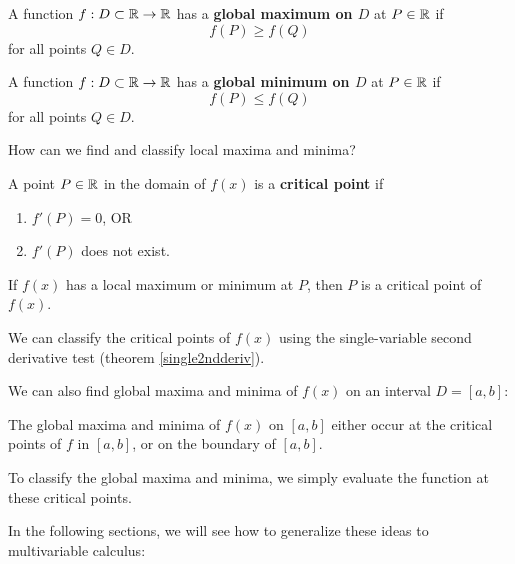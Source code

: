 \begin{definition}
    A function $f: D \subset \mathbb{R} \to \mathbb{R}$ has a \textbf{global maximum on $D$} at $P \in \mathbb{R}$ if
    $$f(P) \geq f(Q)$$
    for all points $Q \in D$.
    \end{definition}

    \begin{definition}
    A function $f: D \subset \mathbb{R} \to \mathbb{R}$ has a \textbf{global minimum on $D$} at $P \in \mathbb{R}$ if 
    $$f(P) \leq f(Q)$$
    for all points $Q \in D$.
    \end{definition}

\begin{motivating}
    How can we find and classify local maxima and minima?
\end{motivating}

\begin{definition}
        A point $P \in \mathbb{R}$ in the domain of $f(x)$ is a \textbf{critical point} if
        
        \begin{enumerate}
            \item $f'(P) = 0$, OR
            \item $f'(P)$ does not exist.
        \end{enumerate}
        
    \end{definition}

    \begin{theorem}
        If $f(x)$ has a local maximum or minimum at $P$, then $P$ is a critical point of $f(x)$.
    \end{theorem}

    We can classify the critical points of $f(x)$ using the single-variable second derivative test (theorem \ref{single2ndderiv}).

    We can also find global maxima and minima of $f(x)$ on an interval $D = [a,b]$:

    \begin{theorem}
    The global maxima and minima of $f(x)$ on $[a,b]$ either occur at the critical points of $f$ in $[a,b]$, or on the boundary of $[a,b]$.
    \end{theorem}

    To classify the global maxima and minima, we simply evaluate the function at these critical points.

    In the following sections, we will see how to generalize these ideas to multivariable calculus:

